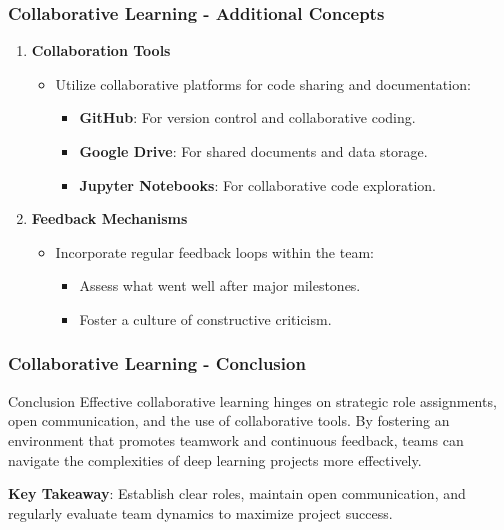 \documentclass[aspectratio=169]{beamer}
\begin{document}
\begin{frame}[fragile]
    \frametitle{Collaborative Learning - Additional Concepts}
    \begin{enumerate}[resume]
        \item \textbf{Collaboration Tools}
        \begin{itemize}
            \item Utilize collaborative platforms for code sharing and documentation:
            \begin{itemize}
                \item \textbf{GitHub}: For version control and collaborative coding.
                \item \textbf{Google Drive}: For shared documents and data storage.
                \item \textbf{Jupyter Notebooks}: For collaborative code exploration.
            \end{itemize}
        \end{itemize}
        \item \textbf{Feedback Mechanisms}
        \begin{itemize}
            \item Incorporate regular feedback loops within the team:
            \begin{itemize}
                \item Assess what went well after major milestones.
                \item Foster a culture of constructive criticism.
            \end{itemize}
        \end{itemize}
    \end{enumerate}
\end{frame}

\begin{frame}[fragile]
    \frametitle{Collaborative Learning - Conclusion}
    \begin{block}{Conclusion}
        Effective collaborative learning hinges on strategic role assignments, open communication, and the use of collaborative tools. By fostering an environment that promotes teamwork and continuous feedback, teams can navigate the complexities of deep learning projects more effectively.
    \end{block}
    \textbf{Key Takeaway}: Establish clear roles, maintain open communication, and regularly evaluate team dynamics to maximize project success.
\end{frame}
\end{document}
